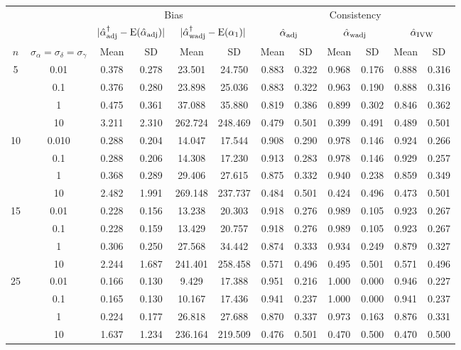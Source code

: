 \documentclass[11pt]{article}
\def\E#1{\mathrm{E}(#1)} %
\theoremstyle{definition}
\begin{document}
\begin{sidewaysfigure}
\centering
\centering
\begin{tabular}{cccccc|cccccc}
  && \multicolumn{4}{c|}{Bias}  & \multicolumn{6}{c}{Consistency}  \\ 
   & & \multicolumn{2}{c}{$|\hat{\alpha}_{\rm adj}^{\dagger}-\E{\hat{\alpha}_{\rm adj}}|$} & \multicolumn{2}{c|}{$|\hat{\alpha}_{\rm wadj}^{\dagger}-\E{\alpha_1}|$} & \multicolumn{2}{c}{$\hat{\alpha}_{\rm adj}$}  & \multicolumn{2}{c}{$\hat{\alpha}_{\rm wadj}$}  & \multicolumn{2}{c}{$\hat{\alpha}_{\rm IVW}$}  \\ 
  $n$   & $\sigma_{\alpha} = \sigma_{\delta}=\sigma_{\gamma}$  & Mean & SD & Mean & SD & Mean & SD & Mean & SD & Mean & SD\\ 
  \hline
\multirow{4}{*}{5} & 0.01  & 0.378 & 0.278 & 23.501 & 24.750 & 0.883 & 0.322 & 0.968 & 0.176 & 0.888 & 0.316 \\ 
  & 0.1 & 0.376 & 0.280 & 23.898 & 25.036 & 0.883 & 0.322 & 0.963 & 0.190 & 0.888 & 0.316 \\ 
  & 1 & 0.475 & 0.361 & 37.088 & 35.880 & 0.819 & 0.386 & 0.899 & 0.302 & 0.846 & 0.362 \\ 
  & 10  & 3.211 & 2.310 & 262.724 & 248.469 & 0.479 & 0.501 & 0.399 & 0.491 & 0.489 & 0.501 \\ 
\multirow{4}{*}{10}  & 0.010  & 0.288 & 0.204 & 14.047 & 17.544 & 0.908 & 0.290 & 0.978 & 0.146 & 0.924 & 0.266 \\ 
 & 0.1  & 0.288 & 0.206 & 14.308 & 17.230 & 0.913 & 0.283 & 0.978 & 0.146 & 0.929 & 0.257 \\ 
   & 1  & 0.368 & 0.289 & 29.406 & 27.615 & 0.875 & 0.332 & 0.940 & 0.238 & 0.859 & 0.349 \\ 
   & 10  & 2.482 & 1.991 & 269.148 & 237.737 & 0.484 & 0.501 & 0.424 & 0.496 & 0.473 & 0.501 \\ 
 \multirow{4}{*}{15} & 0.01   & 0.228 & 0.156 & 13.238 & 20.303 & 0.918 & 0.276 & 0.989 & 0.105 & 0.923 & 0.267 \\ 
 &0.1  & 0.228 & 0.159 & 13.429 & 20.757 & 0.918 & 0.276 & 0.989 & 0.105 & 0.923 & 0.267 \\ 
   & 1 & 0.306 & 0.250 & 27.568 & 34.442 & 0.874 & 0.333 & 0.934 & 0.249 & 0.879 & 0.327 \\ 
 & 10 & 2.244 & 1.687 & 241.401 & 258.458 & 0.571 & 0.496 & 0.495 & 0.501 & 0.571 & 0.496 \\ 
\multirow{4}{*}{25}   & 0.01   & 0.166 & 0.130 & 9.429 & 17.388 & 0.951 & 0.216 & 1.000 & 0.000 & 0.946 & 0.227 \\ 
 &0.1  & 0.165 & 0.130 & 10.167 & 17.436 & 0.941 & 0.237 & 1.000 & 0.000 & 0.941 & 0.237 \\ 
 & 1 & 0.224 & 0.177 & 26.818 & 27.688 & 0.870 & 0.337 & 0.973 & 0.163 & 0.876 & 0.331 \\ 
  &  10 & 1.637 & 1.234 & 236.164 & 219.509 & 0.476 & 0.501 & 0.470 & 0.500 & 0.470 & 0.500 \\ 
\end{tabular}
\end{sidewaysfigure}
\end{document}
